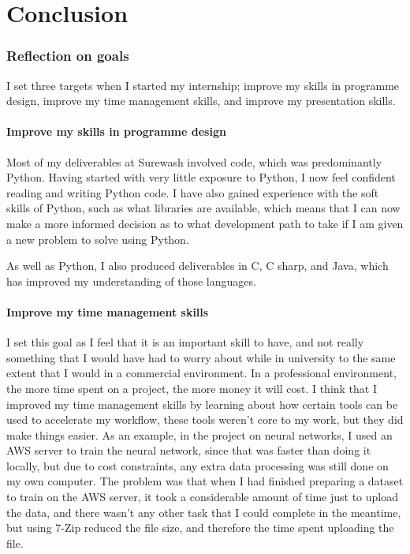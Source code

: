 \part{Conclusion}
\section{Reflection on goals}
I set three targets when I started my internship; improve my skills in programme design, improve my time management skills, and improve my presentation skills.
    \subsection{Improve my skills in programme design} Most of my deliverables at Surewash involved code, which was predominantly Python. Having started with very little exposure to Python, I now feel confident reading and writing Python code. I have also gained experience with the soft skills of Python, such as what libraries are available, which means that I can now make a more informed decision as to what development path to take if I am given a new problem to solve using Python.

    As well as Python, I also produced deliverables in C, C sharp, and Java, which has improved my understanding of those languages.

    \subsection{Improve my time management skills} I set this goal as I feel that it is an important skill to have, and not really something that I would have had to worry about while in university to the same extent that I would in a commercial environment. In a professional environment, the more time spent on a project, the more money it will cost. I think that I improved my time management skills by learning about how certain tools can be used to accelerate my workflow, these tools weren't core to my work, but they did make things easier. As an example, in the project on neural networks, I used an AWS server to train the neural network, since that was faster than doing it locally, but due to cost constraints, any extra data processing was still done on my own computer. The problem was that when I had finished preparing a dataset to train on the AWS server, it took a considerable amount of time just to upload the data, and there wasn't any other task that I could complete in the meantime, but using 7-Zip reduced the file size, and therefore the time spent uploading the file.


